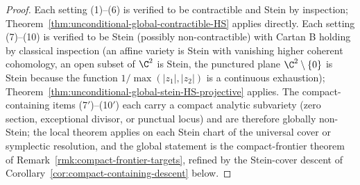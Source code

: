 \begin{proof}
Each setting (1)--(6) is verified to be contractible and Stein by
inspection; Theorem~\ref{thm:unconditional-global-contractible-HS}
applies directly.  Each setting (7)--(10) is verified to be Stein
(possibly non-contractible) with Cartan B holding by classical
inspection (an affine variety is Stein with vanishing higher coherent
cohomology, an open subset of \(\C^2\) is Stein, the punctured plane
\(\C^2\setminus\{0\}\) is Stein because the function \(1/\!\max(|z_1|,
|z_2|)\) is a continuous exhaustion);
Theorem~\ref{thm:unconditional-global-stein-HS-projective} applies.
The compact-containing items (7$'$)--(10$'$) each carry a compact
analytic subvariety (zero section, exceptional divisor, or punctual
locus) and are therefore globally non-Stein; the local theorem
applies on each Stein chart of the universal cover or symplectic
resolution, and the global statement is the compact-frontier theorem
of Remark~\ref{rmk:compact-frontier-targets}, refined by the
Stein-cover descent of
Corollary~\ref{cor:compact-containing-descent} below.
\end{proof}

